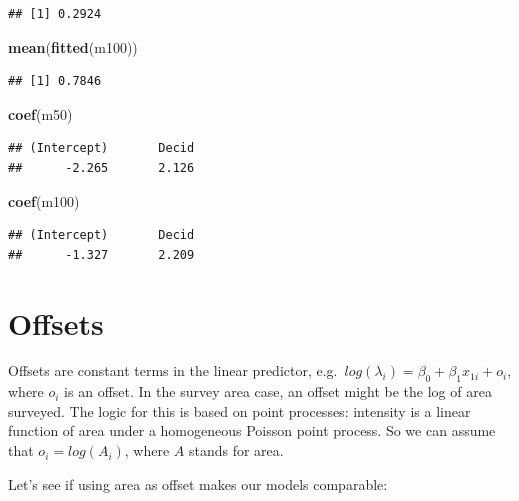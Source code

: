 \documentclass[12pt,]{book}
\newenvironment{Shaded}{\begin{snugshade}}{\end{snugshade}}
\newcommand{\KeywordTok}[1]{\textcolor[rgb]{0.13,0.29,0.53}{\textbf{#1}}}
\newcommand{\NormalTok}[1]{#1}
\begin{document}
\begin{verbatim}
## [1] 0.2924
\end{verbatim}

\begin{Shaded}
\begin{Highlighting}[]
\KeywordTok{mean}\NormalTok{(}\KeywordTok{fitted}\NormalTok{(m100))}
\end{Highlighting}
\end{Shaded}

\begin{verbatim}
## [1] 0.7846
\end{verbatim}

\begin{Shaded}
\begin{Highlighting}[]
\KeywordTok{coef}\NormalTok{(m50)}
\end{Highlighting}
\end{Shaded}

\begin{verbatim}
## (Intercept)       Decid 
##      -2.265       2.126
\end{verbatim}

\begin{Shaded}
\begin{Highlighting}[]
\KeywordTok{coef}\NormalTok{(m100)}
\end{Highlighting}
\end{Shaded}

\begin{verbatim}
## (Intercept)       Decid 
##      -1.327       2.209
\end{verbatim}

\hypertarget{offsets}{%
\section{Offsets}\label{offsets}}

Offsets are constant terms in the linear predictor,
e.g.~\(log(\lambda_i) = \beta_0 + \beta_1 x_{1i} + o_i\),
where \(o_i\) is an offset. In the survey area case,
an offset might be the log of area surveyed.
The logic for this is based on point processes:
intensity is a linear function of area
under a homogeneous Poisson point process.
So we can assume that \(o_i = log(A_i)\), where \(A\) stands for area.

Let's see if using area as offset makes our models comparable:
\end{document}
